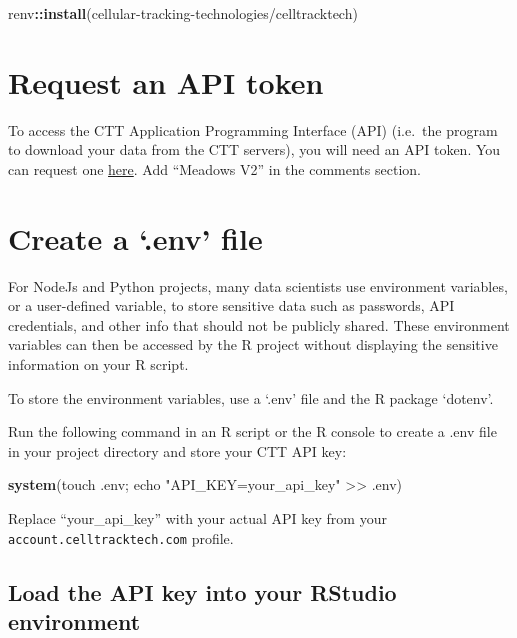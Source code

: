 \documentclass[
]{book}
\newenvironment{Shaded}{\begin{snugshade}}{\end{snugshade}}
\newcommand{\FunctionTok}[1]{\textcolor[rgb]{0.13,0.29,0.53}{\textbf{#1}}}
\newcommand{\NormalTok}[1]{#1}
\newcommand{\SpecialCharTok}[1]{\textcolor[rgb]{0.81,0.36,0.00}{\textbf{#1}}}
\newcommand{\StringTok}[1]{\textcolor[rgb]{0.31,0.60,0.02}{#1}}
\begin{document}
\begin{Shaded}
\begin{Highlighting}[]
\NormalTok{renv}\SpecialCharTok{::}\FunctionTok{install}\NormalTok{(}\StringTok{\textquotesingle{}cellular{-}tracking{-}technologies/celltracktech\textquotesingle{}}\NormalTok{)}
\end{Highlighting}
\end{Shaded}

\section{Request an API token}\label{request-an-api-token}

To access the CTT Application Programming Interface (API) (i.e.~the program to download your data from the CTT servers), you will need an API token. You can request one \href{https://celltracktech.com/pages/csd-radio-api-key-request}{here}. Add ``Meadows V2'' in the comments section.

\section{Create a `.env' file}\label{create-a-.env-file}

For NodeJs and Python projects, many data scientists use environment variables, or a user-defined variable, to store sensitive data such as passwords, API credentials, and other info that should not be publicly shared. These environment variables can then be accessed by the R project without displaying the sensitive information on your R script.

To store the environment variables, use a `.env' file and the R package `dotenv'.

Run the following command in an R script or the R console to create a .env file in your project directory and store your CTT API key:

\begin{Shaded}
\begin{Highlighting}[]
\FunctionTok{system}\NormalTok{(}\StringTok{\textquotesingle{}touch .env; echo "API\_KEY=your\_api\_key" \textgreater{}\textgreater{} .env\textquotesingle{}}\NormalTok{)}
\end{Highlighting}
\end{Shaded}

Replace ``your\_api\_key'' with your actual API key from your \texttt{account.celltracktech.com} profile.

\subsection{Load the API key into your RStudio environment}\label{load-the-api-key-into-your-rstudio-environment}
\end{document}
